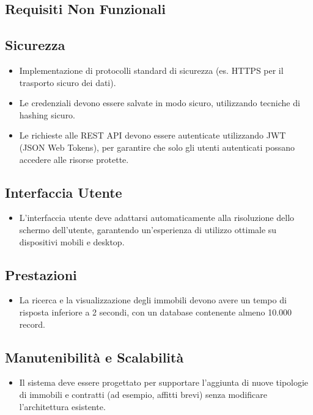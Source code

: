 \subsection{Requisiti Non Funzionali}

\subsection*{Sicurezza}

\begin{itemize}
    \item [NF\textminus S1] Implementazione di protocolli standard di sicurezza (es. HTTPS per il trasporto sicuro dei dati).
    \item [NF\textminus S2] Le credenziali devono essere salvate in modo sicuro, utilizzando tecniche di hashing sicuro.
    \item [NF\textminus S3] Le richieste alle REST API devono essere autenticate utilizzando JWT (JSON Web Tokens), per garantire che solo gli utenti autenticati possano accedere alle risorse protette.
\end{itemize}

\subsection*{Interfaccia Utente}
\begin{itemize}
    \item [NF\textminus UI1] L'interfaccia utente deve adattarsi automaticamente alla risoluzione dello schermo dell'utente, garantendo un'esperienza di utilizzo ottimale su dispositivi mobili e desktop.
\end{itemize}

\subsection*{Prestazioni}
\begin{itemize}
    \item [NF\textminus P1] La ricerca e la visualizzazione degli immobili devono avere un tempo di risposta inferiore a 2 secondi, con un database contenente almeno 10.000 record.
\end{itemize}

\subsection*{Manutenibilità e Scalabilità}
\begin{itemize}
    \item [NF\textminus MS1] Il sistema deve essere progettato per supportare l'aggiunta di nuove tipologie di immobili e contratti (ad esempio, affitti brevi) senza modificare l'architettura esistente.
\end{itemize}
